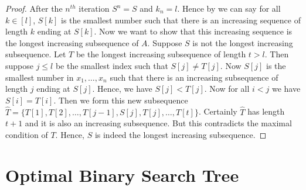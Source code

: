 \begin{proof}
	After the $n^{th}$ iteration $S^n=S$ and $k_n=l$. Hence by  we can say for all $k\in[l]$, $S[k]$ is the smallest number such that there is an increasing sequence of length $k$ ending at $S[k]$. Now we want to show that this increasing sequence is the longest increasing subsequence of $A$. Suppose $S$ is not the longest increasing subsequence. Let $T$ be the longest increasing subsequence of length $t>l$. Then suppose $j\leq l$ be the smallest index such that $S[j]\neq T[j]$. Now $S[j]$ is the smallest number in $x_1,\dots, x_n$ such that there is an increasing subsequence of length $j$ ending at $S[j]$. Hence, we have $S[j]<T[j]$. Now for all $i<j$ we have $S[i]=T[i]$.   Then we form this new subsequence $\hat{T}=\{T[1],T[2],\dots, T[j-1], S[j],T[j],\dots, T[t]\}$. Certainly $\hat{T}$ has length $t+1$ and it is also an increasing subsequence. But this contradicts the maximal condition of $T$. Hence, $S$ is indeed the longest increasing subsequence.
\end{proof}

\section{Optimal Binary Search Tree}
\begin{algoprob}
\end{algoprob}

